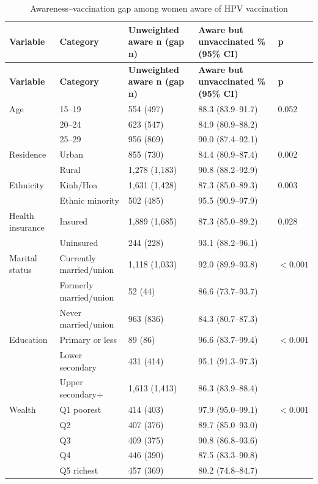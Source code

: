 \begin{longtable}{|p{2.5cm}|p{2.8cm}|p{2.2cm}|p{3.2cm}|p{1.0cm}|}
\caption{Awareness--vaccination gap among women aware of HPV vaccination}
\label{tab:bivar_gap}\\
\hline
\textbf{Variable} & \textbf{Category} & \textbf{Unweighted aware n (gap n)} & \textbf{Aware but unvaccinated \% (95\% CI)} & \textbf{p} \\
\hline
\endfirsthead
\hline
\textbf{Variable} & \textbf{Category} & \textbf{Unweighted aware n (gap n)} & \textbf{Aware but unvaccinated \% (95\% CI)} & \textbf{p} \\
\hline
\endhead
Age & 15--19 & 554 (497) & 88.3 (83.9--91.7) & 0.052 \\
 & 20--24 & 623 (547) & 84.9 (80.9--88.2) &  \\
 & 25--29 & 956 (869) & 90.0 (87.4--92.1) &  \\
\hline
Residence & Urban & 855 (730) & 84.4 (80.9--87.4) & 0.002 \\
 & Rural & 1,278 (1,183) & 90.8 (88.2--92.9) &  \\
\hline
Ethnicity & Kinh/Hoa & 1,631 (1,428) & 87.3 (85.0--89.3) & 0.003 \\
 & Ethnic minority & 502 (485) & 95.5 (90.9--97.9) &  \\
\hline
Health insurance & Insured & 1,889 (1,685) & 87.3 (85.0--89.2) & 0.028 \\
 & Uninsured & 244 (228) & 93.1 (88.2--96.1) &  \\
\hline
Marital status & Currently married/union & 1,118 (1,033) & 92.0 (89.9--93.8) & $<0.001$ \\
 & Formerly married/union & 52 (44) & 86.6 (73.7--93.7) &  \\
 & Never married/union & 963 (836) & 84.3 (80.7--87.3) &  \\
\hline
Education & Primary or less & 89 (86) & 96.6 (83.7--99.4) & $<0.001$ \\
 & Lower secondary & 431 (414) & 95.1 (91.3--97.3) &  \\
 & Upper secondary+ & 1,613 (1,413) & 86.3 (83.9--88.4) &  \\
\hline
Wealth & Q1 poorest & 414 (403) & 97.9 (95.0--99.1) & $<0.001$ \\
 & Q2 & 407 (376) & 89.7 (85.0--93.0) &  \\
 & Q3 & 409 (375) & 90.8 (86.8--93.6) &  \\
 & Q4 & 446 (390) & 87.5 (83.3--90.8) &  \\
 & Q5 richest & 457 (369) & 80.2 (74.8--84.7) &  \\

\end{longtable}
